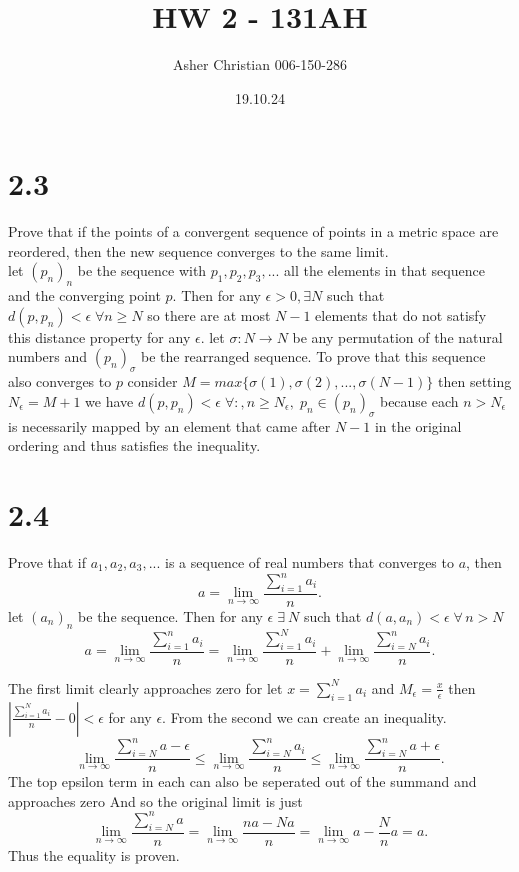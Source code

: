 \documentclass{article}
\title{HW 2 - 131AH}
\author{Asher Christian 006-150-286}
\date{19.10.24}
\begin{document}
    \maketitle
    \section{2.3}
    Prove that if the points of a convergent sequence of points in a metric space
    are reordered, then the new sequence converges to the same limit.
    \\
    let $(p_n)_n$ be the sequence with $p_1,p_2,p_3,...$ all the elements in that sequence and the converging point $p$.
    Then for any $\epsilon > 0, \exists N$ such that $d(p,p_n) < \epsilon \; \forall n\ge N$ so there are at most $N-1$ elements that do not
    satisfy this distance property for any $\epsilon $. let $\sigma : N \rightarrow N$ be any permutation of the natural numbers and
    $(p_n)_\sigma $ be the rearranged sequence. To prove that this sequence also converges to $p$ consider $M=max\{\sigma (1),\sigma (2),...,\sigma (N-1)\}$ then setting $N_\epsilon = M+1$ we have 
    $d(p,p_n) < \epsilon \; \forall :, n \ge N_\epsilon, \; p_n \in (p_n)_\sigma $ because each $n > N_\epsilon $  is necessarily mapped by an element that came after $N-1$ in the original ordering and thus satisfies the inequality.

    \section{2.4}
    Prove that if $a_1,a_2,a_3,...$ is a sequence of real numbers that converges to $a$, then
    \[
       a = \lim_{n\to \infty} \frac{\sum_{i=1}^{n}a_i}{n}
    .\] 
    let $(a_n)_n$ be the sequence. Then for any $\epsilon \; \exists \: N$ such that $d(a,a_n) < \epsilon \; \forall \, n > N$ 
    \[
        a = \lim_{n\to \infty} \frac{\sum_{i=1}^{n}a_i}{n} = \lim_{n\to\infty}\frac{\sum_{i=1}^{N}a_i}{n} + \lim_{n\to\infty} \frac{\sum_{i=N}^{n}a_i}{n}
    .\] 

    The first limit clearly approaches zero for let $x = \sum_{i=1}^{N}a_i$ and $M_\epsilon = \frac{x}{\epsilon }$ then $|\frac{\sum_{i=1}^{N}a_i}{n}-0| < \epsilon $ for any $\epsilon $. From the second we can create an inequality.
    \[
        \lim_{n\to\infty}\frac{\sum_{i=N}^{n}a - \epsilon }{n} \le \lim_{n\to\infty}\frac{\sum_{i=N}^{n}a_i}{n} \le \lim_{n\to\infty}\frac{\sum_{i=N}^{n}a + \epsilon }{n}
    .\] 
    The top epsilon term in each can also be seperated out of the summand and approaches zero 
    And so the original limit is just
    \[
    \lim_{n\to\infty}\frac{\sum_{i=N}^{n}a}{n} = \lim_{n\to\infty} \frac{na - Na}{n} = \lim_{n\to\infty}a - \frac{N}{n}a = a
    .\] 
    Thus the equality is proven.
\end{document}
